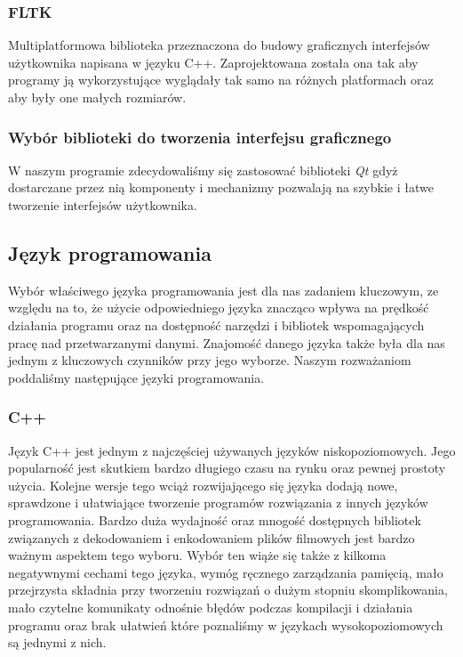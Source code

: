 \documentclass[twoside]{projektInzynierskiMS}
\begin{document}
\subsubsection{FLTK}
Multiplatformowa biblioteka przeznaczona do budowy graficznych interfejsów użytkownika napisana w języku C++. Zaprojektowana została ona tak aby programy ją wykorzystujące wyglądały tak samo na różnych platformach oraz aby były one małych rozmiarów.
\subsubsection{Wybór biblioteki do tworzenia interfejsu graficznego}
W naszym programie zdecydowaliśmy się zastosować biblioteki \emph{Qt} gdyż dostarczane przez nią komponenty i mechanizmy pozwalają na szybkie i łatwe tworzenie interfejsów użytkownika.

\subsection{Język programowania}

Wybór właściwego języka programowania jest dla nas zadaniem kluczowym, ze względu na to, że użycie odpowiedniego języka znacząco wpływa na prędkość działania programu oraz na dostępność narzędzi i bibliotek wspomagających pracę nad przetwarzanymi danymi. Znajomość danego języka także była dla nas jednym z kluczowych czynników przy jego wyborze. Naszym rozważaniom poddaliśmy następujące języki programowania.

\subsubsection{C++}
Język C++ jest jednym z najczęściej używanych języków niskopoziomowych. Jego popularność jest skutkiem bardzo długiego czasu na rynku oraz pewnej prostoty użycia. Kolejne wersje tego wciąż rozwijającego się języka dodają nowe, sprawdzone i ułatwiające tworzenie programów rozwiązania z innych języków programowania. Bardzo duża wydajność oraz mnogość dostępnych bibliotek związanych z dekodowaniem i enkodowaniem plików filmowych jest bardzo ważnym aspektem tego wyboru. Wybór ten wiąże się także z kilkoma negatywnymi cechami tego języka, wymóg ręcznego zarządzania pamięcią, mało przejrzysta składnia przy tworzeniu rozwiązań o dużym stopniu skomplikowania, mało czytelne komunikaty odnośnie błędów podczas kompilacji i działania programu oraz brak ułatwień które poznaliśmy w językach wysokopoziomowych są jednymi z nich. 
\end{document}
